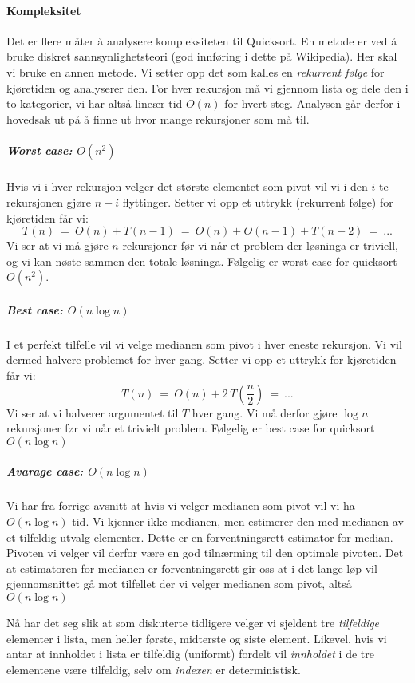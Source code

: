 \paragraph{Kompleksitet}
Det er flere måter å analysere kompleksiteten til Quicksort. En metode er ved å bruke diskret sannsynlighetsteori (god innføring i dette på Wikipedia). Her skal vi bruke en annen metode. Vi setter opp det som kalles en \emph{rekurrent følge} for kjøretiden og analyserer den. For hver rekursjon må vi gjennom lista og dele den i to kategorier, vi har altså lineær tid $ O(n) $ for hvert steg. Analysen går derfor i hovedsak ut på å finne ut hvor mange rekursjoner som må til. 

\subparagraph{Worst case: $ O(n^2) $}
Hvis vi i hver rekursjon velger det største elementet som pivot vil vi i den $ i $-te rekursjonen gjøre $ n-i $ flyttinger. Setter vi opp et uttrykk (rekurrent følge) for kjøretiden får vi:
\[ T(n) ~=~ O(n) + T(n-1) ~=~ O(n) + O(n-1) + T(n-2) ~=~ ... \]
Vi ser at vi må gjøre $ n $ rekursjoner før vi når et problem der løsninga er triviell, og vi kan nøste sammen den totale løsninga. Følgelig er worst case for quicksort $ O(n^2) $.

\subparagraph{Best case: $ O(n\log n) $}
I et perfekt tilfelle vil vi velge medianen som pivot i hver eneste rekursjon. Vi vil dermed halvere problemet for hver gang. Setter vi opp et uttrykk for kjøretiden får vi:
\[ T(n) ~=~ O(n) + 2\,T\left( \frac{n}{2} \right) ~=~ ... \]
Vi ser at vi halverer argumentet til $ T $ hver gang. Vi må derfor gjøre $ \log n $ rekursjoner før vi når et trivielt problem. Følgelig er best case for quicksort $ O(n\log n) $

\subparagraph{Avarage case: $ O(n\log n) $}
Vi har fra forrige avsnitt at hvis vi velger medianen som pivot vil vi ha $ O(n\log n) $ tid.  Vi kjenner ikke medianen, men estimerer den med medianen av et tilfeldig utvalg elementer. Dette er en forventningsrett estimator for median. Pivoten vi velger vil derfor være en god tilnærming til den optimale pivoten. Det at estimatoren for medianen er forventningsrett gir oss at i det lange løp vil gjennomsnittet gå mot tilfellet der vi velger medianen som pivot, altså $ O(n\log n) $

Nå har det seg slik at som diskuterte tidligere velger vi sjeldent tre \emph{tilfeldige} elementer i lista, men heller første, midterste og siste element. Likevel, hvis vi antar at innholdet i lista er tilfeldig (uniformt) fordelt vil \emph{innholdet} i de tre elementene være tilfeldig, selv om \emph{indexen} er deterministisk.



